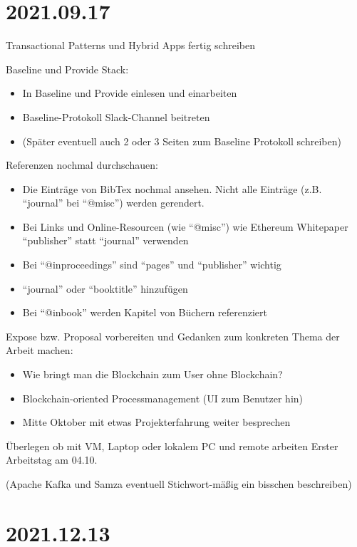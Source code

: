 \section{2021.09.17}
Transactional Patterns und Hybrid Apps fertig schreiben

Baseline und Provide Stack:
\begin{itemize}
\item In Baseline und Provide einlesen und einarbeiten
\item Baseline-Protokoll Slack-Channel beitreten
\item (Später eventuell auch 2 oder 3 Seiten zum Baseline Protokoll schreiben)
\end{itemize}

Referenzen nochmal durchschauen:
\begin{itemize}
\item Die Einträge von BibTex nochmal ansehen. Nicht alle Einträge (z.B. ``journal'' bei ``@misc'') werden gerendert.
\item Bei Links und Online-Resourcen (wie ``@misc'') wie Ethereum Whitepaper ``publisher'' statt ``journal'' verwenden
\item Bei ``@inproceedings'' sind ``pages'' und ``publisher'' wichtig
\item ``journal'' oder ``booktitle'' hinzufügen
\item Bei ``@inbook'' werden Kapitel von Büchern referenziert
\end{itemize}

Expose bzw. Proposal vorbereiten und Gedanken zum konkreten Thema der Arbeit machen:
\begin{itemize}
\item Wie bringt man die Blockchain zum User ohne Blockchain?
\item Blockchain-oriented Processmanagement (UI zum Benutzer hin)
\item Mitte Oktober mit etwas Projekterfahrung weiter besprechen
\end{itemize}


Überlegen ob mit VM, Laptop oder lokalem PC und remote arbeiten
Erster Arbeitstag am 04.10.

(Apache Kafka und Samza eventuell Stichwort-mäßig ein bisschen beschreiben)

\section{2021.12.13}
\label{sec:2021.12.13}

